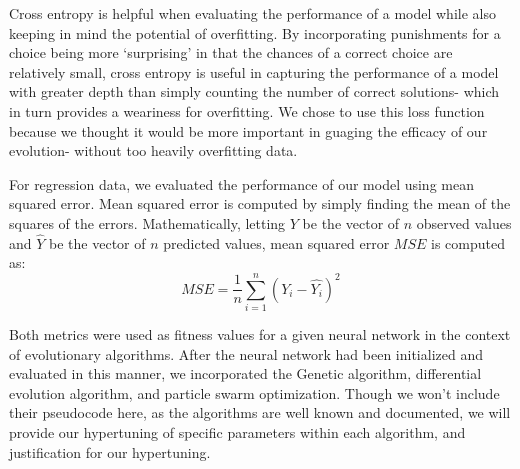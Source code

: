 \documentclass[twoside,11pt]{article}
\begin{document}
Cross entropy is helpful when evaluating the performance of a model while also keeping in mind the potential of overfitting. By incorporating punishments for a choice being more 
`surprising' in that the chances of a correct choice are relatively small, cross entropy is useful in capturing the performance of a model with greater depth than simply 
counting the number of correct solutions- which in turn provides a weariness for overfitting.
We chose to use this loss function because we thought it would be more important in guaging the efficacy of our evolution- without too
heavily overfitting data. 

For regression data, we evaluated the performance of our model using mean squared error. Mean squared error is computed by
simply finding the mean of the squares of the errors. Mathematically, letting $Y$ be the vector of $n$ observed values and $\hat{Y}$ be the vector of $n$ predicted
values, mean squared error $MSE$ is computed as:
\begin{equation}
MSE = \frac{1}{n} \sum_{i=1}^{n} (Y_i - \hat{Y_i})^2
\end{equation}

Both metrics were used as fitness values for a given neural network in the context of evolutionary algorithms. After the neural network had been initialized and evaluated
in this manner, we incorporated the Genetic algorithm, differential evolution algorithm, and particle swarm optimization. Though we won't include their pseudocode here,
as the algorithms are well known and documented, we will provide our hypertuning of specific parameters within each algorithm, and justification for our hypertuning.
\end{document}
